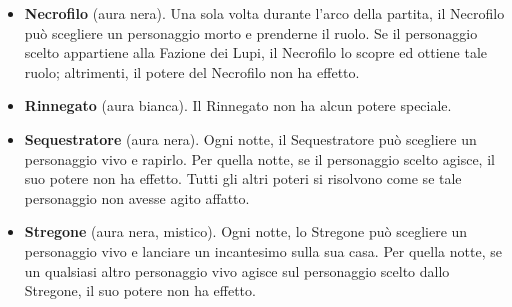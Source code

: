 \documentclass[a4paper,10pt]{article}
\begin{document}
\begin{itemize}

 \item {\bf Necrofilo} (aura nera). Una sola volta durante l'arco della partita, il Necrofilo può scegliere un personaggio morto e prenderne il ruolo. Se il personaggio scelto appartiene alla Fazione dei Lupi, il Necrofilo lo scopre ed ottiene tale ruolo; altrimenti, il potere del Necrofilo non ha effetto.
  
 \item {\bf Rinnegato} (aura bianca). Il Rinnegato non ha alcun potere speciale. %

 \item {\bf Sequestratore} (aura nera). Ogni notte, il Sequestratore può scegliere un personaggio vivo e rapirlo. Per quella notte, se il personaggio scelto agisce, il suo potere non ha effetto. Tutti gli altri poteri si risolvono come se tale personaggio non avesse agito affatto. %
 
 

 \item {\bf Stregone} (aura nera, mistico). Ogni notte, lo Stregone può scegliere un personaggio vivo e lanciare un incantesimo sulla sua casa. Per quella notte, se un qualsiasi altro personaggio vivo agisce sul personaggio scelto dallo Stregone, il suo potere non ha effetto.
 
%  
 
 
\end{itemize}
\end{document}
